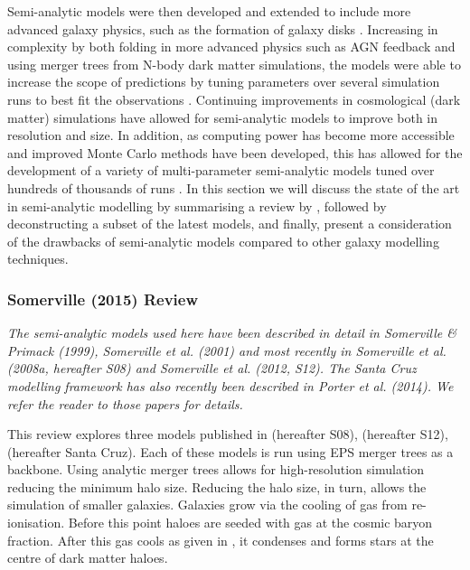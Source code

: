
Semi-analytic models were then developed and extended to include more advanced galaxy physics, such as the formation of galaxy disks \citep{Mo1998TheDiscs}. Increasing in complexity by both folding in more advanced physics such as AGN feedback and using merger trees from N-body dark matter simulations, the models were able to increase the scope of predictions by tuning parameters over several simulation runs to best fit the observations \citep{Bower2006BreakingFormation}. Continuing improvements in cosmological (dark matter) simulations have allowed for semi-analytic models to improve both in resolution and size. In addition, as computing power has become more accessible and improved Monte Carlo methods have been developed, this has allowed for the development of a variety of multi-parameter semi-analytic models tuned over hundreds of thousands of runs \citep{Guo2011FromCosmology,DeLucia2011TimesCosmology,Fontanot2011TheUniverse,Menci2014TriggeringInteractions,Somerville2015StarGas}.
In this section we will discuss the state of the art in semi-analytic modelling by summarising a review by \citet{Somerville2015StarGas}, followed by deconstructing a subset of the latest models, and finally, present a consideration of the drawbacks of semi-analytic models compared to other galaxy modelling techniques.

\subsubsection{Somerville (2015) Review \citep{Somerville2015StarGas}}
\textit{The semi-analytic models used here have been described in detail in Somerville \& Primack (1999), Somerville et al. (2001) and most recently in Somerville et al. (2008a, hereafter S08) and Somerville et al. (2012, S12). The Santa Cruz modelling framework has also recently been described in Porter et al. (2014). We refer the reader to those papers for details.}

This review explores three models published in \citet{Somerville2008ANuclei} (hereafter S08), \citet{Somerville2012GalaxyObservations} (hereafter S12), \citet{Porter2014ModellingSpace} (hereafter Santa Cruz). Each of these models is run using EPS merger trees as a backbone. Using analytic merger trees allows for high-resolution simulation reducing the minimum halo size. Reducing the halo size, in turn, allows the simulation of smaller galaxies. Galaxies grow via the cooling of gas from re-ionisation. Before this point haloes are seeded with gas at the cosmic baryon fraction. After this gas cools as given in \cite{White1991GalaxyClustering}, it condenses and forms stars at the centre of dark matter haloes. 

